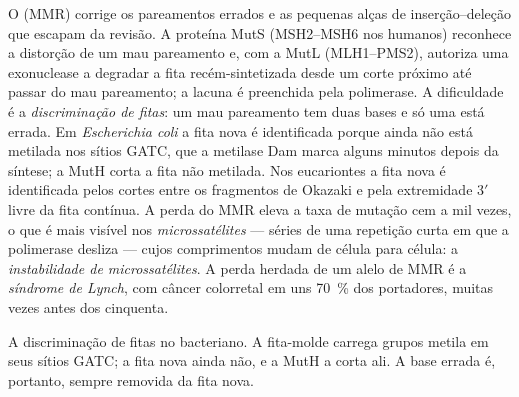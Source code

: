 \begin{definition}\label{def:b3:dna-repair:mmr}
O \emph{} (MMR) corrige os pareamentos errados
e as pequenas alças de inserção--deleção que escapam da revisão. A
proteína MutS (MSH2--MSH6 nos humanos) reconhece a distorção de um mau
pareamento e, com a MutL (MLH1--PMS2), autoriza uma exonuclease a
degradar a fita recém-sintetizada desde um corte próximo até passar do
mau pareamento; a lacuna é preenchida pela polimerase. A dificuldade é
a \emph{discriminação de fitas}: um mau pareamento tem duas bases e só
uma está errada. Em \emph{Escherichia coli} a fita nova é identificada
porque ainda não está metilada nos sítios GATC, que a metilase Dam
marca alguns minutos depois da síntese; a MutH corta a fita não
metilada. Nos eucariontes a fita nova é identificada pelos cortes
entre os fragmentos de Okazaki e pela extremidade 3$'$ livre da fita
contínua. A perda do MMR eleva a taxa de mutação cem a mil vezes, o
que é mais visível nos \emph{microssatélites} --- séries de uma
repetição curta em que a polimerase desliza --- cujos comprimentos
mudam de célula para célula: a \emph{instabilidade de microssatélites}.
A perda herdada de um alelo de MMR é a \emph{síndrome de Lynch}, com
câncer colorretal em uns \qty{70}{\%} dos portadores, muitas vezes
antes dos cinquenta.
\end{definition}

\begin{omfigure}

{\small A discriminação de fitas no 
bacteriano. A fita-molde carrega grupos metila em seus sítios GATC; a
fita nova ainda não, e a MutH a corta ali. A base errada é, portanto,
sempre removida da fita nova.}
\end{omfigure}

